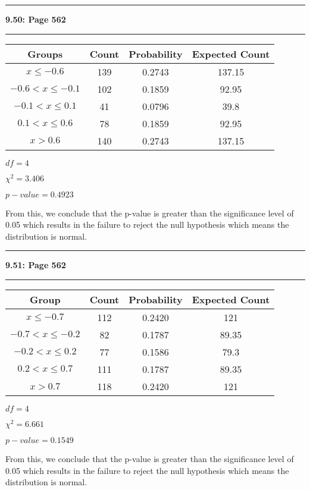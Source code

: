 \documentclass[11pt]{article}
\newcommand\question[2]{\vspace{.25in}\hrule\textbf{#1: #2}\vspace{.5em}\hrule\vspace{.10in}}
\begin{document}
\question{9.50}{Page 562}
	\begin{tabular}{|c|c|c|c|}
		\hline
		Groups & Count & Probability & Expected Count\\
		\hline
		$x \leq -0.6$ & 139 & 0.2743 & 137.15\\
		\hline
		$-0.6 < x \leq -0.1$ & 102 & 0.1859 & 92.95\\
		\hline
		$-0.1 < x \leq 0.1$ & 41 & 0.0796 & 39.8\\
		\hline
		$0.1 < x \leq 0.6$ & 78 & 0.1859 & 92.95\\
		\hline
		$x > 0.6$ & 140 & 0.2743 & 137.15\\
		\hline
	\end{tabular}\par
	$df = 4$ \par
	$\chi^{2} = 3.406$\par
	$p-value=0.4923$\par
	From this, we conclude that the p-value is greater than the significance level of 0.05 which results in the failure to reject the null hypothesis which means the distribution is normal.\pagebreak
	
	
\question{9.51}{Page 562}
	\begin{tabular}{|c|c|c|c|}
		\hline
		Group & Count & Probability & Expected Count\\
		\hline
		$x \leq -0.7$ & 112 & 0.2420 & 121\\
		\hline
		$-0.7 < x \leq -0.2$ & 82 & 0.1787 & 89.35\\
		\hline
		$-0.2 < x \leq 0.2$ & 77 & 0.1586 & 79.3\\
		\hline
		$0.2 < x \leq 0.7$ & 111 & 0.1787 & 89.35\\
		\hline
		$x > 0.7$ & 118 & 0.2420 & 121\\
		\hline
	\end{tabular}\par
	$df=4$\par
	$\chi^{2} = 6.661$\par
	$p-value=0.1549$\par
	From this, we conclude that the p-value is greater than the significance level of 0.05 which results in the failure to reject the null hypothesis which means the distribution is normal.
\end{document}
